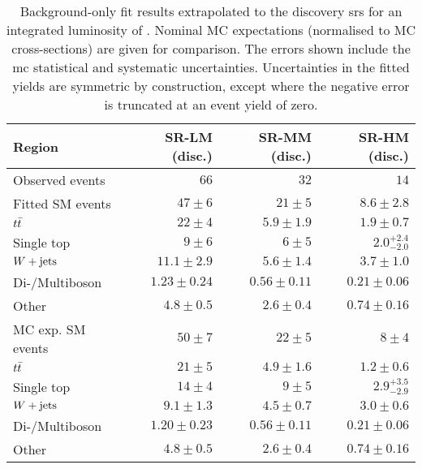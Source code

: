 

\begin{table}
\begin{center}
{\small
\begin{tabular}{lrrr}
\toprule
Region           & SR-LM (disc.)           & SR-MM (disc.)           & SR-HM  (disc.)            \\
\midrule
Observed events          & $66$              & $32$              & $14$                    \\
\midrule
Fitted SM events         & $47 \pm 6$          & $21 \pm 5$          & $8.6 \pm 2.8$              \\
\midrule
        $t\bar{t}$         & $22 \pm 4$          & $5.9 \pm 1.9$          & $1.9 \pm 0.7$              \\
        Single top         & $9 \pm 6$          & $6 \pm 5$          & $2.0_{-2.0}^{+2.4}$              \\
        $W+\mathrm{jets}$         & $11.1 \pm 2.9$          & $5.6 \pm 1.4$          & $3.7 \pm 1.0$              \\
        Di-/Multiboson         & $1.23 \pm 0.24$          & $0.56 \pm 0.11$          & $0.21 \pm 0.06$              \\
        Other         & $4.8 \pm 0.5$          & $2.6 \pm 0.4$          & $0.74 \pm 0.16$              \\
\toprule
MC exp. SM events              & $50 \pm 7$          & $22 \pm 5$          & $8 \pm 4$              \\
\midrule
        $t\bar{t}$         & $21 \pm 5$          & $4.9 \pm 1.6$          & $1.2 \pm 0.6$              \\
        Single top         & $14 \pm 4$          & $9 \pm 5$          & $2.9_{-2.9}^{+3.5}$              \\
        $W+\mathrm{jets}$         & $9.1 \pm 1.3$          & $4.5 \pm 0.7$          & $3.0 \pm 0.6$              \\
        Di-/Multiboson         & $1.20 \pm 0.23$          & $0.56 \pm 0.11$          & $0.21 \pm 0.06$              \\
        Other        & $4.8 \pm 0.5$          & $2.6 \pm 0.4$          & $0.74 \pm 0.16$              \\
\bottomrule
\end{tabular}
}
\end{center}
\caption{ Background-only fit results extrapolated to the discovery \glspl{sr} for an integrated luminosity of \onethirtynineifb. Nominal MC expectations (normalised to MC cross-sections) are given for comparison. The errors shown include the \gls{mc} statistical and systematic uncertainties. Uncertainties in the fitted yields are symmetric by construction, except where the negative error is truncated at an event yield of zero.
}
\label{tab:results_bkg_only_SR_disc}
\end{table}
%